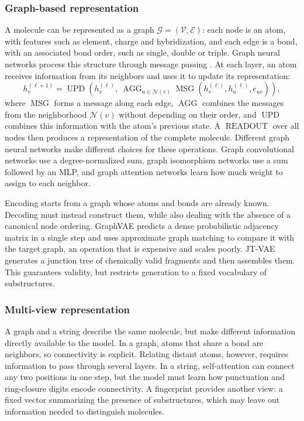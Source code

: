 \documentclass[a4paper,12pt]{article}
\newcommand{\Gcal}{\mathcal{G}}
\newcommand{\Vcal}{\mathcal{V}}
\newcommand{\Ecal}{\mathcal{E}}
\DeclareMathOperator{\AGG}{AGG}
\DeclareMathOperator{\MSG}{MSG}
\DeclareMathOperator{\UPD}{UPD}
\DeclareMathOperator{\READOUT}{READOUT}
\begin{document}
\subsubsection*{Graph-based representation}
A molecule can be represented as a graph $\Gcal=(\Vcal,\Ecal)$: each node is an atom, with features such as element, charge and hybridization, and each edge is a bond, with an associated bond order, such as single, double or triple. Graph neural networks process this structure through message passing \parencite{Gilmer_Schoenholz_Riley_Vinyals_Dahl_2017}. At each layer, an atom receives information from its neighbors and uses it to update its representation:
\begin{equation*}\label{eq:mpnn}
    h_v^{(\ell+1)} = \UPD\!\left(h_v^{(\ell)},\ \AGG_{u\in\mathcal{N}(v)}\MSG\!\left(h_v^{(\ell)},h_u^{(\ell)},e_{uv}\right)\right),
\end{equation*}
where $\MSG$ forms a message along each edge, $\AGG$ combines the messages from the neighborhood $\mathcal{N}(v)$ without depending on their order, and $\UPD$ combines this information with the atom's previous state. A $\READOUT$ over all nodes then produces a representation of the complete molecule. Different graph neural networks make different choices for these operations. Graph convolutional networks \parencite{Kipf_Welling_2017} use a degree-normalized sum, graph isomorphism networks \parencite{Xu_Hu_Leskovec_Jegelka_2019} use a sum followed by an MLP, and graph attention networks \parencite{Velickovic_Cucurull_Casanova_Romero_Lio_Bengio_2018} learn how much weight to assign to each neighbor.

Encoding starts from a graph whose atoms and bonds are already known. Decoding must instead construct them, while also dealing with the absence of a canonical node ordering. GraphVAE \parencite{Simonovsky_Komodakis_2018} predicts a dense probabilistic adjacency matrix in a single step and uses approximate graph matching to compare it with the target graph, an operation that is expensive and scales poorly. JT-VAE \parencite{Jin_Barzilay_Jaakkola_2018} generates a junction tree of chemically valid fragments and then assembles them. This guarantees validity, but restricts generation to a fixed vocabulary of substructures.

\subsubsection*{Multi-view representation}
A graph and a string describe the same molecule, but make different information directly available to the model. In a graph, atoms that share a bond are neighbors, so connectivity is explicit. Relating distant atoms, however, requires information to pass through several layers. In a string, self-attention can connect any two positions in one step, but the model must learn how punctuation and ring-closure digits encode connectivity. A fingerprint provides another view: a fixed vector summarizing the presence of substructures, which may leave out information needed to distinguish molecules.
\end{document}

